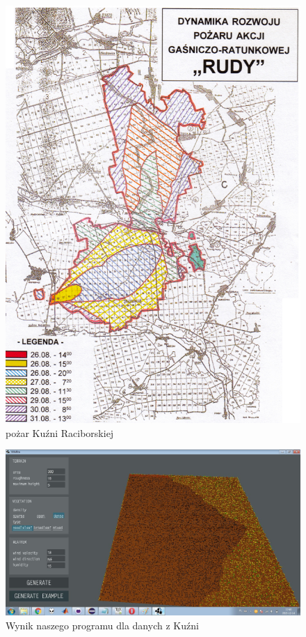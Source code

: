 \documentclass[a4paper, 11pt]{article}
\begin{document}
	\begin{figure}
			\includegraphics[scale=0.7]{kuznia.jpg}
			\caption{pożar Kuźni Raciborskiej}
	\end{figure}	
	\begin{figure}
			\includegraphics[scale=0.4]{kuznianasza.jpg}
			\caption{Wynik naszego programu dla danych z Kuźni}
	\end{figure}	
\end{document}
